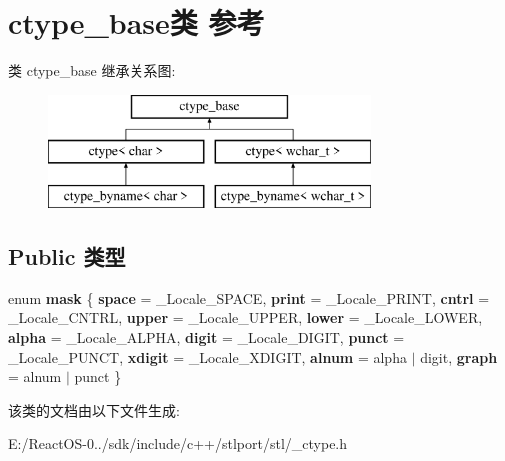 \hypertarget{classctype__base}{}\section{ctype\+\_\+base类 参考}
\label{classctype__base}
类 ctype\+\_\+base 继承关系图\+:\begin{figure}[H]
\begin{center}
\leavevmode
\includegraphics[height=3.000000cm]{classctype__base}
\end{center}
\end{figure}
\subsection*{Public 类型}
\begin{DoxyCompactItemize}
\item 
\mbox{\label{classctype__base_a83e04c75be1b3c080de63517f9935630}} 
enum {\bfseries mask} \{ \newline
{\bfseries space} = \+\_\+\+Locale\+\_\+\+S\+P\+A\+CE, 
{\bfseries print} = \+\_\+\+Locale\+\_\+\+P\+R\+I\+NT, 
{\bfseries cntrl} = \+\_\+\+Locale\+\_\+\+C\+N\+T\+RL, 
{\bfseries upper} = \+\_\+\+Locale\+\_\+\+U\+P\+P\+ER, 
\newline
{\bfseries lower} = \+\_\+\+Locale\+\_\+\+L\+O\+W\+ER, 
{\bfseries alpha} = \+\_\+\+Locale\+\_\+\+A\+L\+P\+HA, 
{\bfseries digit} = \+\_\+\+Locale\+\_\+\+D\+I\+G\+IT, 
{\bfseries punct} = \+\_\+\+Locale\+\_\+\+P\+U\+N\+CT, 
\newline
{\bfseries xdigit} = \+\_\+\+Locale\+\_\+\+X\+D\+I\+G\+IT, 
{\bfseries alnum} = alpha $\vert$ digit, 
{\bfseries graph} = alnum $\vert$ punct
 \}
\end{DoxyCompactItemize}


该类的文档由以下文件生成\+:\begin{DoxyCompactItemize}
\item 
E\+:/\+React\+O\+S-\/0../sdk/include/c++/stlport/stl/\+\_\+ctype.\+h\end{DoxyCompactItemize}
